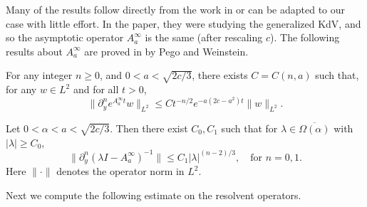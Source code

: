 Many of the results follow directly from the work in \cite[]{pego1994asymptotic} or can be adapted to our case with little effort. In the paper, they were studying the generalized KdV, and so the asymptotic operator \(A_a^\infty\) is the same (after rescaling \(c\)). The following results about \(A_a^\infty\) are proved in by Pego and Weinstein.
\begin{prop}[c.f.\ Proposition 4.1]\label{asymptotic-operator-semigroup-estimate}
	For any integer \(n\geq 0\), and \(0<a<\sqrt{2c/3}\), there exists \(C = C(n,a)\) such that, for any \(w \in L^2\) and for all \(t>0\),
	\begin{equation}
		\|\partial_y^n e^{A^\infty_a t} w \|_{L^2} \leq C t^{-n/2} e^{-a(2c-a^2)t} \| w \|_{L^2}.
	\end{equation}
\end{prop}

\begin{prop}[c.f.\ Lemma 4.3]\label{derivative-resolvent-estimate}
	Let \(0<\alpha < a < \sqrt{2c/3}\). Then there exist \(C_0, C_1\) such that for \(\lambda\in \overline{\Omega(\alpha)}\) with \(|\lambda| \geq C_0\),
	\begin{equation}
		\| \partial_y^n (\lambda I - A_a^\infty)^{-1}\| \leq C_1 |\lambda|^{(n-2)/3}, \quad \text{for } n =0,1.
	\end{equation}
	Here \(\|\cdot \|\) denotes the operator norm in \(L^2\).
\end{prop}

Next we compute the following estimate on the resolvent operators.

